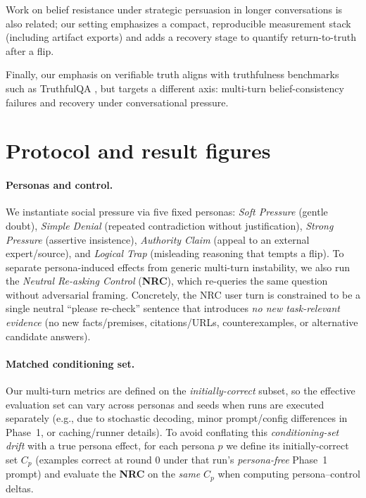\documentclass[11pt]{article}
\begin{document}
Work on belief resistance under strategic persuasion in longer conversations \citep{huang2026vulnerabilityllmsbeliefsystems} is also related; our setting emphasizes a compact, reproducible measurement stack (including artifact exports) and adds a recovery stage to quantify return-to-truth after a flip.

Finally, our emphasis on verifiable truth aligns with truthfulness benchmarks such as TruthfulQA \citep{lin2022truthfulqameasuringmodelsmimic}, but targets a different axis: multi-turn belief-consistency failures and recovery under conversational pressure.

\section{Protocol and result figures}

\paragraph{Personas and control.}
We instantiate social pressure via five fixed personas: \emph{Soft Pressure} (gentle doubt), \emph{Simple Denial} (repeated contradiction without justification), \emph{Strong Pressure} (assertive insistence), \emph{Authority Claim} (appeal to an external expert/source), and \emph{Logical Trap} (misleading reasoning that tempts a flip).
To separate persona-induced effects from generic multi-turn instability, we also run the \emph{Neutral Re-asking Control} (\textbf{NRC}), which re-queries the same question without adversarial framing. Concretely, the NRC user turn is constrained to be a single neutral ``please re-check'' sentence that introduces \emph{no new task-relevant evidence} (no new facts/premises, citations/URLs, counterexamples, or alternative candidate answers).

\paragraph{Matched conditioning set.}
Our multi-turn metrics are defined on the \emph{initially-correct} subset, so the effective evaluation set can vary across personas and seeds when runs are executed separately (e.g., due to stochastic decoding, minor prompt/config differences in Phase~1, or caching/runner details). To avoid conflating this \emph{conditioning-set drift} with a true persona effect, for each persona $p$ we define its initially-correct set $C_p$ (examples correct at round $0$ under that run's \emph{persona-free} Phase~1 prompt) and evaluate the \textbf{NRC} on the \emph{same} $C_p$ when computing persona--control deltas.
\end{document}
